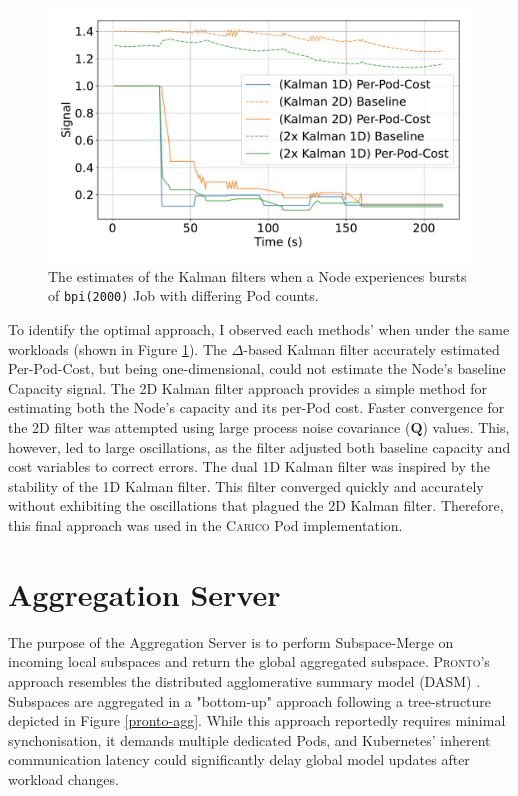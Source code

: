 \begin{figure}[H]
    \centering
    \includegraphics[width=\textwidth]{images/filter-comparison.pdf}
    \caption{The estimates of the Kalman filters when a Node experiences bursts
    of \texttt{bpi(2000)} Job with differing Pod counts.}
    \label{fig:filter-evaluation}
\end{figure}

To identify the optimal approach, I observed each methods' when under the same
workloads (shown in Figure \ref{fig:filter-evaluation}). The $\Delta$-based
Kalman filter accurately estimated Per-Pod-Cost, but being one-dimensional,
could not estimate the Node's baseline Capacity signal. The 2D Kalman filter
approach provides a simple method for estimating both the Node's capacity and
its per-Pod cost. Faster convergence for the 2D filter was attempted using large
process noise covariance ($\mathbf{Q}$) values. This, however, led to large
oscillations, as the filter adjusted both baseline capacity and cost variables
to correct errors. The dual 1D Kalman filter was inspired by the stability of
the 1D Kalman filter. This filter converged quickly and accurately without
exhibiting the oscillations that plagued the 2D Kalman filter. Therefore, this
final approach was used in the \textsc{Carico} Pod implementation.

\section{Aggregation Server}
The purpose of the Aggregation Server is to perform Subspace-Merge on incoming
local subspaces and return the global aggregated subspace. \textsc{Pronto}'s
approach resembles the distributed agglomerative summary model (DASM) \cite{tanenbaum2002distributed}.
Subspaces are aggregated in a "bottom-up" approach following a tree-structure
depicted in Figure \ref{pronto-agg}. While this approach reportedly requires
minimal synchonisation, it demands multiple dedicated Pods, and Kubernetes'
inherent communication latency could significantly delay global model updates
after workload changes.

